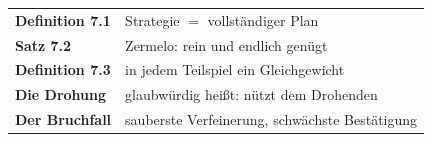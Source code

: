 \begin{merksatz}
\begin{center}
\renewcommand{\arraystretch}{1.5}
\begin{tabular}{@{}P{3.0cm}P{5.6cm}@{}}
\toprule
\textbf{Definition 7.1} & Strategie $=$ vollständiger Plan\\
\textbf{Satz 7.2} & Zermelo: rein und endlich genügt\\
\textbf{Definition 7.3} & in jedem Teilspiel ein Gleichgewicht\\
\textbf{Die Drohung} & glaubwürdig heißt: nützt dem Drohenden\\
\textbf{Der Bruchfall} & sauberste Verfeinerung, schwächste Bestätigung\\
\bottomrule
\end{tabular}
\end{center}

\begin{center}
\begin{minipage}{0.88\textwidth}
\end{minipage}
\end{center}
\end{merksatz}
